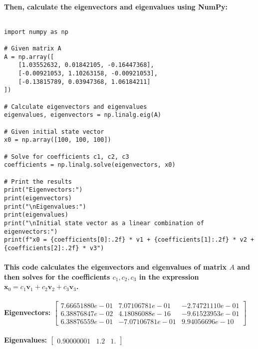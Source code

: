 \paragraph{Then, calculate the eigenvectors and eigenvalues using NumPy:}
% 
$$$$
% 
\begin{lstlisting}[style=pystyle]
import numpy as np

# Given matrix A
A = np.array([
    [1.03552632, 0.01842105, -0.16447368],
    [-0.00921053, 1.10263158, -0.00921053],
    [-0.13815789, 0.03947368, 1.06184211]
])

# Calculate eigenvectors and eigenvalues
eigenvalues, eigenvectors = np.linalg.eig(A)

# Given initial state vector
x0 = np.array([100, 100, 100])

# Solve for coefficients c1, c2, c3
coefficients = np.linalg.solve(eigenvectors, x0)

# Print the results
print("Eigenvectors:")
print(eigenvectors)
print("\nEigenvalues:")
print(eigenvalues)
print("\nInitial state vector as a linear combination of eigenvectors:")
print(f"x0 = {coefficients[0]:.2f} * v1 + {coefficients[1]:.2f} * v2 + {coefficients[2]:.2f} * v3")
\end{lstlisting}
% 
\paragraph{This code calculates the eigenvectors and eigenvalues of matrix \(A\) and then solves for the coefficients \(c_1, c_2, c_3\) in the expression \(\mathbf{x}_0 = c_1 \mathbf{v}_1 + c_2 \mathbf{v}_2 + c_3 \mathbf{v}_3\).}
% 
\paragraph{\textbf{Eigenvectors:}
    $
        \left[
            \begin{matrix}
                7.66651880e-01 & 7.07106781e-01  & -2.74721110e-01 \\
                6.38876847e-02 & 4.18086088e-16  & -9.61523953e-01 \\
                6.38876559e-01 & -7.07106781e-01 & 9.94056696e-10
            \end{matrix}
            \right]
    $}
\paragraph{\textbf{Eigenvalues:}
    $
        \left[ \begin{matrix}
                0.90000001 & 1.2 & 1.
            \end{matrix}\right]
    $}
